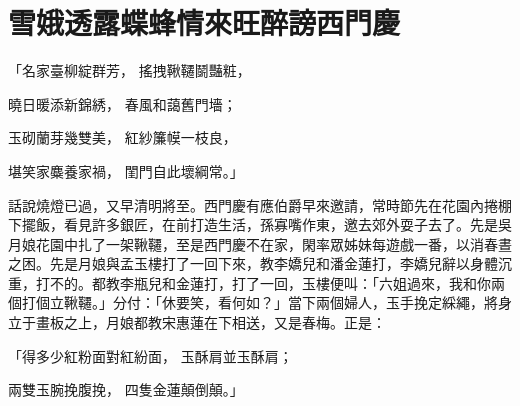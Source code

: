 %

\chapter{雪娥透露蝶蜂情\KG 來旺醉謗西門慶}


\begin{showcontents}{}



「名家臺柳綻群芳，  搖拽鞦韆鬬豔粧，

曉日暖添新錦綉，  春風和藹舊門墻；

玉砌蘭芽幾雙美，  紅紗簾幙一枝良，

堪笑家麋養家禍，  閨門自此壞綱常。」

話說燒燈已過，又早清明將至。西門慶有應伯爵早來邀請，常時節先在花園內捲棚下擺飯，看見許多銀匠，在前打造生活，孫寡嘴作東，邀去郊外耍子去了。先是吳月娘花園中扎了一架鞦韆，至是西門慶不在家，閑率眾姊妹每遊戲一番，以消春晝之困。先是月娘與孟玉樓打了一回下來，教李嬌兒和潘金蓮打，李嬌兒辭以身體沉重，打不的。都教李瓶兒和金蓮打，打了一回，玉樓便叫：「六姐過來，我和你兩個打個立鞦韆。」分付：「休要笑，看何如？」當下兩個婦人，玉手挽定綵繩，將身立于畫板之上，月娘都教宋惠蓮在下相送，又是春梅。正是：

「得多少紅粉面對紅紛面，  玉酥肩並玉酥肩；

兩雙玉腕挽腹挽，    四隻金蓮顛倒顛。」


\end{showcontents}
